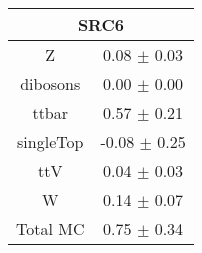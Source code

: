 \begin{tabular}{c|c}
\hline\hline
\multicolumn{2}{c}{\bf SRC6 } \\ \hline 
Z & 0.08 $\pm$ 0.03 \\
dibosons & 0.00 $\pm$ 0.00 \\
ttbar & 0.57 $\pm$ 0.21 \\
singleTop & -0.08 $\pm$ 0.25 \\
ttV & 0.04 $\pm$ 0.03 \\
W & 0.14 $\pm$ 0.07 \\
\hline
Total MC & 0.75 $\pm$ 0.34 \\
\hline\hline
\end{tabular}
